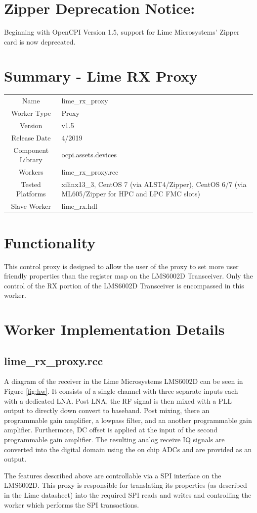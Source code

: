 \documentclass{article}
\author{} %
\date{Version \docVersion} %
\title{\docTitle}
\def\docVersion{1.5}
\def\comp{lime\_rx\_proxy}
\def\Comp{Lime RX Proxy}
\begin{document}
\section*{Zipper Deprecation Notice:}
Beginning with OpenCPI Version 1.5, support for Lime Microsystems' Zipper card is now deprecated.
\section*{Summary - \Comp}
\begin{tabular}{|c|M{13.5cm}|}
	\hline
	                  &                \\
	\hline
	Name              & \comp          \\
	\hline
	Worker Type       & Proxy          \\
	\hline
	Version           & v\docVersion \\
	\hline
	Release Date      & 4/2019 \\
	\hline
	Component Library & ocpi.assets.devices   \\
	\hline
	Workers           & \comp.rcc      \\
	\hline
	Tested Platforms  & xilinx13\_3, CentOS 7 (via ALST4/Zipper), CentOS 6/7 (via ML605/Zipper for HPC and LPC FMC slots) \\
	\hline
	Slave Worker      & lime\_rx.hdl   \\
	\hline
\end{tabular}

\section*{Functionality}
This control proxy is designed to allow the user of the proxy to set more user friendly properties than the register map on the LMS6002D Transceiver.  Only the control of the RX portion of the LMS6002D Transceiver is encompassed in this worker.

\section*{Worker Implementation Details}
\subsection*{\comp.rcc}
A diagram of the receiver in the Lime Microsystems LMS6002D can be seen in Figure \ref{fig:hw}. It consists of a single channel with three separate inputs each with a dedicated LNA. Post LNA, the RF signal is then mixed with a PLL output to directly down convert to baseband. Post mixing, there an programmable gain amplifier, a lowpass filter, and an another programmable gain amplifier. Furthermore, DC offset is applied at the input of the second programmable gain amplifier. The resulting analog receive IQ signals are converted into the digital domain using the on chip ADCs and are provided as an output.\par\medskip
\noindent The features described above are controllable via a SPI interface on the LMS6002D. This proxy is responsible for translating its properties (as described in the Lime datasheet) into the required SPI reads and writes and controlling the worker which performs the SPI transactions.
\newpage
\end{document}
